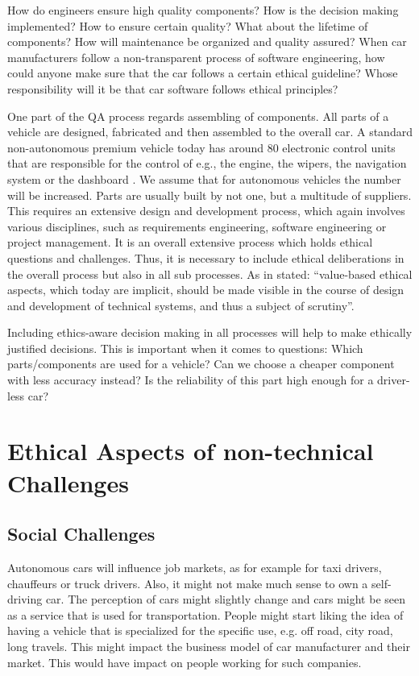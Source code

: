 How do engineers ensure high quality components? How is the decision making implemented? How to ensure certain quality? What about the lifetime of components? How will maintenance be organized and quality assured?
When car manufacturers follow a non-transparent process of software engineering, how could anyone make sure that the car follows a certain ethical guideline? Whose responsibility will it be that car software follows ethical principles?

One part of the QA process regards assembling of components. All parts of a vehicle are designed, fabricated and then assembled to the overall car. A standard non-autonomous premium vehicle today has around 80 electronic control units that are responsible for the control of e.g., the engine, the wipers, the navigation system or the dashboard \cite{BoschGmbH2013}. We assume that for autonomous vehicles the number will be increased. Parts are usually built by not one, but a multitude of suppliers. This requires an extensive design and development process, which again involves various disciplines, such as requirements engineering, software engineering or project management. It is an overall extensive process which holds ethical questions and challenges. Thus, it is necessary to include ethical deliberations in the overall process but also in all sub processes. As in \cite{Sapienza2016a} stated: \enquote{value-based ethical aspects, which today are implicit, should be made visible in the course of design and development of technical systems, and thus a subject of scrutiny}. 

Including ethics-aware decision making in all processes will help to make ethically justified decisions. This is important when it comes to questions: Which parts/components are used for a vehicle? Can we choose a cheaper component with less accuracy instead? Is the reliability of this part high enough for a driver-less car?



\section{Ethical Aspects of non-technical Challenges}
\label{sec:EAofNONTC}

\subsection{Social Challenges}
\label{sec:EAofNONTC:SocialChallenges}

Autonomous cars will influence job markets, as for example for taxi drivers, chauffeurs or truck drivers. Also, it might not make much sense to own a self-driving car. The perception of cars might slightly change and cars might be seen as a service that is used for transportation. People might start liking the idea of having a vehicle that is specialized for the specific use, e.g. off road, city road, long travels. This might impact the business model of car manufacturer and their market. This would have impact on people working for such companies.

